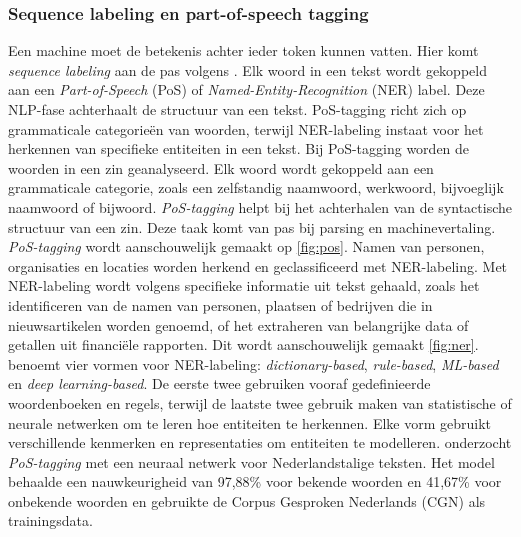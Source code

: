 
\subsubsection{Sequence labeling en part-of-speech tagging}

Een machine moet de betekenis achter ieder token kunnen vatten. Hier komt \textit{sequence labeling} aan de pas volgens \textcite{Eisenstein2019}. Elk woord in een tekst wordt gekoppeld aan een \textit{Part-of-Speech} (PoS) of \textit{Named-Entity-Recognition} (NER) label. Deze NLP-fase achterhaalt de structuur van een tekst. PoS-tagging richt zich op grammaticale categorieën van woorden, terwijl NER-labeling instaat voor het herkennen van specifieke entiteiten in een tekst. Bij PoS-tagging worden de woorden in een zin geanalyseerd. Elk woord wordt gekoppeld aan een grammaticale categorie, zoals een zelfstandig naamwoord, werkwoord, bijvoeglijk naamwoord of bijwoord. \textit{PoS-tagging} helpt bij het achterhalen van de syntactische structuur van een zin. Deze taak komt van pas bij parsing en machinevertaling. \textit{PoS-tagging} wordt aanschouwelijk gemaakt op \ref{fig:pos}. Namen van personen, organisaties en locaties worden herkend en geclassificeerd met NER-labeling. Met NER-labeling wordt volgens \textcite{Jurafsky2014} specifieke informatie uit tekst gehaald, zoals het identificeren van de namen van personen, plaatsen of bedrijven die in nieuwsartikelen worden genoemd, of het extraheren van belangrijke data of getallen uit financiële rapporten. Dit wordt aanschouwelijk gemaakt \ref{fig:ner}. \textcite{Li2018} benoemt vier vormen voor NER-labeling: \textit{dictionary-based}, \textit{rule-based}, \textit{ML-based} en \textit{deep learning-based}. De eerste twee gebruiken vooraf gedefinieerde woordenboeken en regels, terwijl de laatste twee gebruik maken van statistische of neurale netwerken om te leren hoe entiteiten te herkennen. Elke vorm gebruikt verschillende kenmerken en representaties om entiteiten te modelleren. \textcite{Poel2008} onderzocht \textit{PoS-tagging} met een neuraal netwerk voor Nederlandstalige teksten. Het model behaalde een nauwkeurigheid van 97,88\% voor bekende woorden en 41,67\% voor onbekende woorden en gebruikte de Corpus Gesproken Nederlands (CGN) als trainingsdata.

